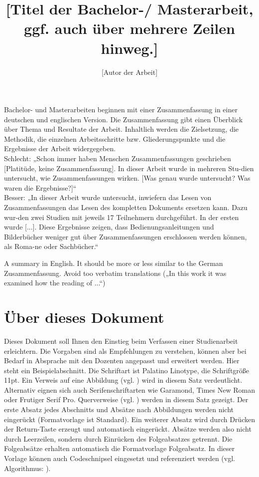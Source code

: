 \documentclass{mi-graduation}
\title{[Titel der Bachelor-/ Masterarbeit, ggf. auch über mehrere Zeilen hinweg.]}
\author{[Autor der Arbeit]}
\begin{document}
\maketitle

\pagestyle{empty}

\newpage

\tableofcontents %
\newpage
\listoffigures %
\newpage
\lstlistoflistings %
\newpage

\summary
Bachelor- und Masterarbeiten beginnen mit einer Zusammenfassung in einer deutschen und englischen Version. Die Zusammenfassung gibt einen Überblick über Thema und Resultate der Arbeit. Inhaltlich werden die Zielsetzung, die Methodik, die einzelnen Arbeitsschritte bzw. Gliederungspunkte und die Ergebnisse der Arbeit widergegeben.\\
Schlecht: „Schon immer haben Menschen Zusammenfassungen geschrieben [Platitüde, keine Zusammenfassung]. In dieser Arbeit wurde in mehreren Stu-dien untersucht, wie Zusammenfassungen wirken. [Was genau wurde untersucht? Was waren die Ergebnisse?]“\\
Besser: „In dieser Arbeit wurde untersucht, inwiefern das Lesen von Zusammenfassungen das Lesen des kompletten Dokuments ersetzen kann. Dazu wur-den zwei Studien mit jeweils 17 Teilnehmern durchgeführt. In der ersten wurde [...]. Diese Ergebnisse zeigen, dass Bedienungsanleitungen und Bilderbücher weniger gut über Zusammenfassungen erschlossen werden können, als Roma-ne oder Sachbücher.“

\abstract
A summary in English. It should be more or less similar to the German Zusammenfassung. Avoid too verbatim translations („In this work it was examined how the reading of ...“)

\newpage
\pagestyle{fancy}

\section{Über dieses Dokument}
Dieses Dokument soll Ihnen den Einstieg beim Verfassen einer Studienarbeit erleichtern. Die Vorgaben sind als Empfehlungen zu verstehen, können aber bei Bedarf in Absprache mit den Dozenten angepasst und erweitert werden. Hier steht ein Beispielabschnitt. Die Schriftart ist Palatino Linotype, die Schriftgröße 11pt. Ein Verweis auf eine Abbildung (vgl. ) wird in diesem Satz verdeutlicht. Alternativ eignen sich auch Serifenschriftarten wie Garamond, Times New Roman oder Frutiger Serif Pro. Querverweise (vgl. ) werden in diesem Satz  gezeigt. Der erste Absatz jedes Abschnitts und Absätze nach Abbildungen werden nicht eingerückt (Formatvorlage ist Standard). Ein weiterer Absatz wird durch Drücken der Return-Taste erzeugt und automatisch eingerückt. Absätze werden also nicht durch Leerzeilen, sondern durch Einrücken des Folgeabsatzes getrennt. Die Folgeabsätze erhalten automatisch die Formatvorlage Folgeabsatz.
In dieser Vorlage können auch Codeschnipsel eingesetzt und referenziert werden (vgl. Algorithmus: ).
\end{document}
